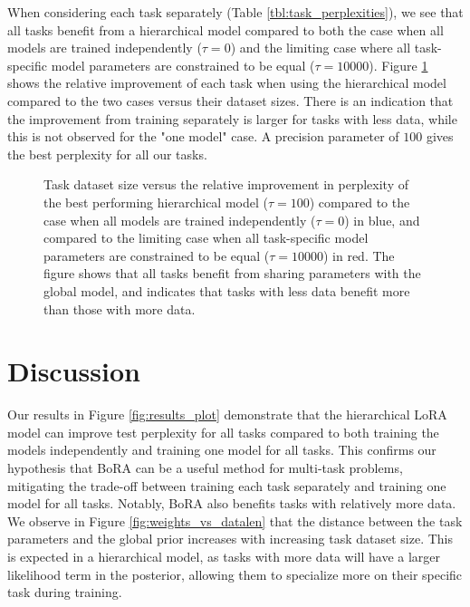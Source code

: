 \documentclass[fullpaper]{nldl}
\begin{document}
When considering each task separately (Table \ref{tbl:task_perplexities}), we see that all tasks benefit from a hierarchical model compared to both the case when all models are trained independently ($\tau = 0$) and the limiting case where all task-specific model parameters are constrained to be equal ($\tau=10000$). Figure \ref{fig:relative_improvement} shows the relative improvement of each task when using the hierarchical model compared to the two cases versus their dataset sizes. There is an indication that the improvement from training separately is larger for tasks with less data, while this is not observed for the "one model" case. A precision parameter of $100$ gives the best perplexity for all our tasks.
\begin{figure}[ht]
    \centering
    \caption{Task dataset size versus the relative improvement in perplexity of the best performing hierarchical model ($\tau = 100$) compared to the case when all models are trained independently ($\tau = 0$) in blue, and compared to the limiting case when all task-specific model parameters are constrained to be equal ($\tau=10000$) in red. The figure shows that all tasks benefit from sharing parameters with the global model, and indicates that tasks with less data benefit more than those with more data.}
    \label{fig:relative_improvement}
\end{figure}

\section{Discussion} \label{sec:discussion}
Our results in Figure \ref{fig:results_plot} demonstrate that the hierarchical LoRA model can improve test perplexity for all tasks compared to both training the models independently and training one model for all tasks. This confirms our hypothesis that BoRA can be a useful method for multi-task problems, mitigating the trade-off between training each task separately and training one model for all tasks. Notably, BoRA also benefits tasks with relatively more data.
We observe in Figure \ref{fig:weights_vs_datalen} that the distance between the task parameters and the global prior increases with increasing task dataset size. This is expected in a hierarchical model, as tasks with more data will have a larger likelihood term in the posterior, allowing them to specialize more on their specific task during training.
\end{document}
